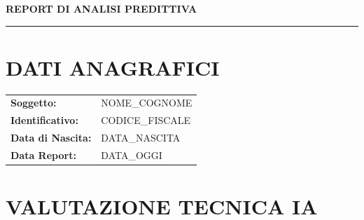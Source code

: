 \documentclass[10pt]{article}
\begin{document}
\begin{center}
    {\large \textbf{REPORT DI ANALISI PREDITTIVA}} \\ 
    \vspace{1mm}
    \rule{\textwidth}{0.5pt} 
\end{center}

\section*{DATI ANAGRAFICI} \vspace{-2mm}
\begin{tabular}{ll}
    \textbf{Soggetto:} & {{NOME_COGNOME}} \\
    \textbf{Identificativo:} & {{CODICE_FISCALE}} \\
    \textbf{Data di Nascita:} & {{DATA_NASCITA}} \\
    \textbf{Data Report:} & {{DATA_OGGI}} \\
\end{tabular}

\vspace{2mm}

\section*{VALUTAZIONE TECNICA IA}
\begin{center}
    \setlength{\fboxsep}{10pt}
\end{center}

\vspace{2mm}
\end{document}
